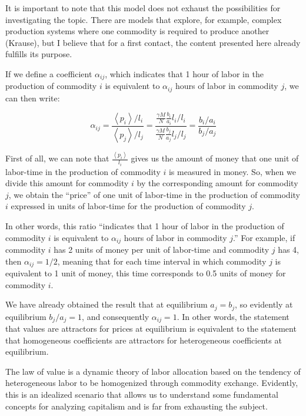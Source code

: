 It is important to note that this model does not exhaust the possibilities for investigating the topic. There are models that explore, for example, complex production systems where one commodity is required to produce another (Krause), but I believe that for a first contact, the content presented here already fulfills its purpose.  

If we define a coefficient $\alpha_{ij}$, which indicates that 1 hour of labor in the production of commodity $i$ is equivalent to $\alpha_{ij}$ hours of labor in commodity $j$, we can then write:


$$
\alpha_{ij}=\frac{\left\langle p_{i}\right\rangle /l_{i}}{\left\langle p_{j}\right\rangle /l_{j}}=\frac{\frac{\gamma M}{N}\frac{b_{i}}{a_{i}}l_{i}/l_{i}}{\frac{\gamma M}{N}\frac{b_{j}}{a_{j}}l_{j}/l_{j}}=\frac{b_{i}/a_{i}}{b_{j}/a_{j}}
$$

First of all, we can note that $\frac{\left\langle p_{i}\right\rangle }{l_{i}}$ gives us the amount of money that one unit of labor-time in the production of commodity $i$ is measured in money. So, when we divide this amount for commodity $i$ by the corresponding amount for commodity $j$, we obtain the “price” of one unit of labor-time in the production of commodity $i$ expressed in units of labor-time for the production of commodity $j$.  

In other words, this ratio “indicates that 1 hour of labor in the production of commodity $i$ is equivalent to $\alpha_{ij}$ hours of labor in commodity $j$.” For example, if commodity $i$ has 2 units of money per unit of labor-time and commodity $j$ has 4, then $\alpha_{ij}=1/2$, meaning that for each time interval in which commodity $j$ is equivalent to 1 unit of money, this time corresponds to 0.5 units of money for commodity $i$.

We have already obtained the result that at equilibrium $a_j=b_j$, so evidently at equilibrium $b_j/a_j=1$, and consequently $\alpha_{ij}=1$. In other words, the statement that values are attractors for prices at equilibrium is equivalent to the statement that homogeneous coefficients are attractors for heterogeneous coefficients at equilibrium.  

The law of value is a dynamic theory of labor allocation based on the tendency of heterogeneous labor to be homogenized through commodity exchange. Evidently, this is an idealized scenario that allows us to understand some fundamental concepts for analyzing capitalism and is far from exhausting the subject.

